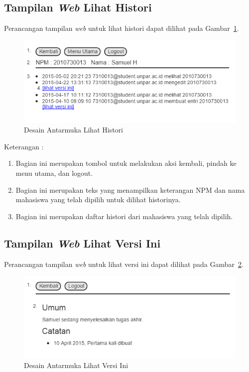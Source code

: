 \subsection{Tampilan {\it Web} Lihat Histori}
Perancangan tampilan {\it web} untuk lihat histori dapat dilihat pada Gambar~\ref{fig:lihathistori}.
\begin{figure}[H]
\centering
\includegraphics[scale=0.5]{Gambar/lihathistori.png}
\caption[Desain Antarmuka Lihat Histori]{Desain Antarmuka Lihat Histori}
\label{fig:lihathistori}
\end{figure}

Keterangan :
\begin{enumerate}[(1)]
\item
Bagian ini merupakan tombol untuk melakukan aksi kembali, pindah ke menu utama,
dan logout.
\item
Bagian ini merupakan teks yang menampilkan keterangan NPM dan nama mahasiswa
yang telah dipilih untuk dilihat historinya.
\item
Bagian ini merupakan daftar histori dari mahasiswa yang telah dipilih.
\end{enumerate}

\subsection{Tampilan {\it Web} Lihat Versi Ini}
Perancangan tampilan {\it web} untuk lihat versi ini dapat dilihat pada
Gambar~\ref{fig:lihatversiini}.
\begin{figure}[H]
\centering
\includegraphics[scale=0.5]{Gambar/lihatversiini.png}
\caption[Desain Antarmuka Lihat Versi Ini]{Desain Antarmuka Lihat Versi Ini}
\label{fig:lihatversiini}
\end{figure}

